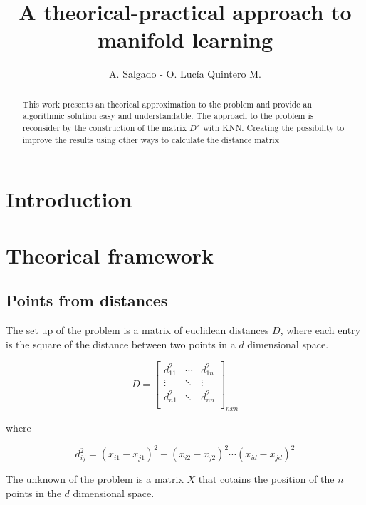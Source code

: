 \documentclass[12pt,journal]{IEEEtran}
\begin{document}
\title{A theorical-practical approach to manifold learning}
\author{A. Salgado - O. Lucía Quintero M.}
\maketitle

\begin{abstract}
    This work presents an theorical approximation to the problem and provide an
    algorithmic solution easy and understandable. The approach to the problem is
    reconsider by the construction of the matrix $D^x$ with KNN. Creating the
    possibility to improve the results using other ways to calculate the distance
    matrix
\end{abstract}

\section{Introduction}

\section{Theorical framework}

    \subsection{Points from distances}

    The set up of the problem is a matrix of euclidean distances $D$, where each
    entry is the square of the distance between two points in a $d$ dimensional
    space.

    \[
        D =
        \begin{bmatrix}
            d_{11}^2 & \cdots & d_{1n}^2\\
            \vdots   & \ddots & \vdots  \\
            d_{n1}^2 & \ddots & d_{nn}^2\\
        \end{bmatrix}_{n x n}
    \]

    where

    \begin{equation*}
        d_{ij}^2 = (x_{i1}-x_{j1})^2 - (x_{i2}-x_{j2})^2 \cdots (x_{id}-x_{jd})^2
    \end{equation*}

    The unknown of the problem is a matrix $X$ that cotains the position of the
    $n$ points in the $d$ dimensional space.
\end{document}
